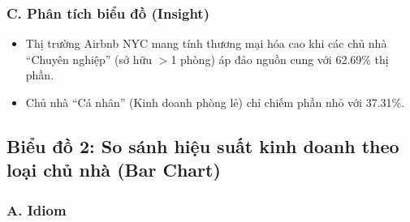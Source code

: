 \subsubsection*{C. Phân tích biểu đồ (Insight)}

\begin{itemize}
    \item Thị trường Airbnb NYC mang tính thương mại hóa cao khi các chủ nhà ``Chuyên nghiệp'' (sở hữu $>$1 phòng) áp đảo nguồn cung với 62.69\% thị phần.
    \item Chủ nhà ``Cá nhân'' (Kinh doanh phòng lẻ) chỉ chiếm phần nhỏ với 37.31\%.
\end{itemize}

\subsection{Biểu đồ 2: So sánh hiệu suất kinh doanh theo loại chủ nhà (Bar Chart)}

\subsubsection*{A. Idiom}

